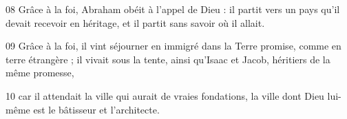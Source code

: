 
08 Grâce à la foi, Abraham obéit à l’appel de Dieu : il partit vers un pays qu’il devait recevoir en héritage, et il partit sans savoir où il allait.

09 Grâce à la foi, il vint séjourner en immigré dans la Terre promise, comme en terre étrangère ; il vivait sous la tente, ainsi qu’Isaac et Jacob, héritiers de la même promesse,

10 car il attendait la ville qui aurait de vraies fondations, la ville dont Dieu lui-même est le bâtisseur et l’architecte.